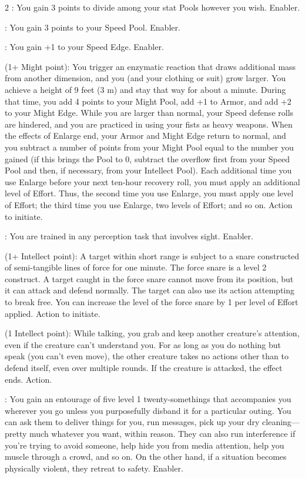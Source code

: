 \begin{multicols}{2}
: You gain 3 points to divide among your stat Pools however you wish. Enabler. 

: You gain 3 points to your Speed Pool. Enabler. 
 
: You gain +1 to your Speed Edge. Enabler. 
 
 (1+ Might point): You trigger an enzymatic reaction that draws additional mass from another dimension, and you (and your clothing or suit) grow larger. You achieve a height of 9 feet (3 m) and stay that way for about a minute. During that time, you add 4 points to your Might Pool, add +1 to Armor, and add +2 to your Might Edge. While you are larger than normal, your Speed defense rolls are hindered, and you are practiced in using your fists as heavy weapons. 
When the effects of Enlarge end, your Armor and Might Edge return to normal, and you subtract a number of points from your Might Pool equal to the number you gained (if this brings the Pool to 0, subtract the overflow first from your Speed Pool and then, if necessary, from your Intellect Pool). Each additional time you use Enlarge before your next ten-hour recovery roll, you must apply an additional level of Effort. Thus, the second time you use Enlarge, you must apply one level of Effort; the third time you use Enlarge, two levels of Effort; and so on. 
Action to initiate. 
 
: You are trained in any perception task that involves sight. Enabler. 
 
 (1+ Intellect point): A target within short range is subject to a snare constructed of semi-tangible lines of force for one minute. The force snare is a level 2 construct. A target caught in the force snare cannot move from its position, but it can attack and defend normally. The target can also use its action attempting to break free. You can increase the level of the force snare by 1 per level of Effort applied. Action to initiate. 
 
 (1 Intellect point): While talking, you grab and keep another creature’s attention, even if the creature can’t understand you. For as long as you do nothing but speak (you can’t even move), the other creature takes no actions other than to defend itself, even over multiple rounds. If the creature is attacked, the effect ends. Action. 
 
: You gain an entourage of five level 1 twenty-somethings that accompanies you wherever you go unless you purposefully disband it for a particular outing. You can ask them to deliver things for you, run messages, pick up your dry cleaning—pretty much whatever you want, within reason. They can also run interference if you’re trying to avoid someone, help hide you from media attention, help you muscle through a crowd, and so on. On the other hand, if a situation becomes physically violent, they retreat to safety. Enabler. 
 

\end{multicols}
